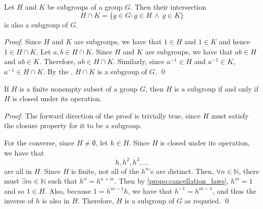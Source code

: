 \documentclass[notoc,notitlepage]{tufte-book}
\begin{document}
\begin{propo}\label{propo:intersection_of_subgroups_is_a_subgroup}
  Let $H$ and $K$ be subgroups of a group $G$. Then their intersection
  \begin{equation*}
    H \cap K = \{g \in G : g \in H \, \land \, g \in K\}
  \end{equation*}
  is also a subgroup of $G$.
\end{propo}

\begin{proof}
  Since $H$ and $K$ are subgroups, we have that $1 \in H$ and $1 \in K$ and hence $1 \in H \cap K$. Let $a, b \in H \cap K$. Since $H$ and $K$ are subgroups, we have that $ab \in H$ and $ab \in K$. Therefore, $ab \in H \cap K$. Similarly, since $a^{-1} \in H$ and $a^{-1} \in K$, $a^{-1} \in H \cap K$. By the , $H \cap K$ is a subgroup of $G$. \qed
\end{proof}

\begin{propo}\label{propo:finite_subgroup_test}
  If $H$ is a finite nonempty subset of a group $G$, then $H$ is a subgroup if and only if $H$ is closed under its operation.
\end{propo}

\begin{proof}
  The forward direction of the proof is trivially true, since $H$ must satisfy the closure property for it to be a subgroup.

  For the converse, since $H \neq \emptyset$, let $h \in H$. Since $H$ is closed under its operation, we have that
  \begin{equation*}
    h, h^2, h^3, ...
  \end{equation*}
  are all in $H$. Since $H$ is finite, not all of the $h^n$'s are distinct. Then, $\forall n \in \mathbb{N}$, there must $\exists m \in \mathbb{N}$ such that $h^n = h^{n + m}$. Then by \autoref{propo:cancellation_laws}, $h^m = 1$ and so $1 \in H$. Also, because $1 = h^{m - 1} h$, we have that $h^{-1} = h^{m - 1}$, and thus the inverse of $h$ is also in $H$. Therefore, $H$ is a subgroup of $G$ as requried. \qed
\end{proof}
\end{document}
